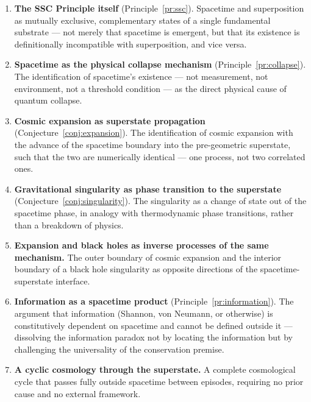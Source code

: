 \documentclass[12pt,a4paper]{article}
\begin{document}
\begin{enumerate}
  \item \textbf{The SSC Principle itself}
        (Principle~\ref{pr:ssc}).  Spacetime and superposition as
        mutually exclusive, complementary states of a single
        fundamental substrate — not merely that spacetime is emergent,
        but that its existence is definitionally incompatible with
        superposition, and vice versa.

  \item \textbf{Spacetime as the physical collapse mechanism}
        (Principle~\ref{pr:collapse}).  The identification of
        spacetime's existence — not measurement, not environment, not
        a threshold condition — as the direct physical cause of
        quantum collapse.

  \item \textbf{Cosmic expansion as superstate propagation}
        (Conjecture~\ref{conj:expansion}).  The identification of
        cosmic expansion with the advance of the spacetime boundary
        into the pre-geometric superstate, such that the two are
        numerically identical — one process, not two correlated ones.

  \item \textbf{Gravitational singularity as phase transition to the
        superstate} (Conjecture~\ref{conj:singularity}).  The
        singularity as a change of state out of the spacetime phase,
        in analogy with thermodynamic phase transitions, rather than a
        breakdown of physics.

  \item \textbf{Expansion and black holes as inverse processes of the
        same mechanism.}  The outer boundary of cosmic expansion and
        the interior boundary of a black hole singularity as opposite
        directions of the spacetime-superstate interface.

  \item \textbf{Information as a spacetime product}
        (Principle~\ref{pr:information}).  The argument that
        information (Shannon, von Neumann, or otherwise) is
        constitutively dependent on spacetime and cannot be defined
        outside it — dissolving the information paradox not by
        locating the information but by challenging the universality
        of the conservation premise.

  \item \textbf{A cyclic cosmology through the superstate.}  A
        complete cosmological cycle that passes fully outside spacetime
        between episodes, requiring no prior cause and no external
        framework.


\end{enumerate}
\end{document}
